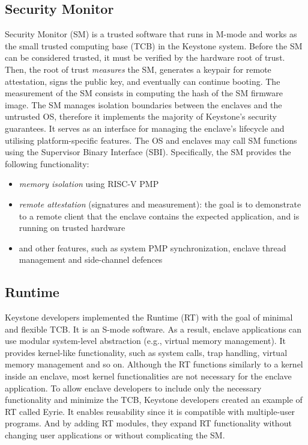 \subsection{Security Monitor}
Security Monitor (SM) is a trusted software that runs in M-mode and works as the small trusted computing base (TCB) in the Keystone system. Before the SM can be considered trusted, it must be verified by the hardware root of trust. Then, the root of trust \textit{measures} the SM, generates a keypair for remote attestation, signs the public key, and eventually can continue booting. The measurement of the SM consists in computing the hash of the SM firmware image. The SM manages isolation boundaries between the enclaves and the untrusted OS, therefore it implements the majority of Keystone's security guarantees.  It serves as an interface for managing the enclave's lifecycle and utilising platform-specific features. The OS and enclaves may call SM functions using the Supervisor Binary Interface (SBI). Specifically, the SM provides the following functionality:
\begin{itemize}
    \item \textit{memory isolation} using RISC-V PMP
    \item \textit{remote attestation} (signatures and measurement): the goal is to demonstrate to a remote client that the enclave contains the expected application, and is running on trusted hardware
    \item and other features, such as system PMP synchronization, enclave thread management and side-channel defences  
\end{itemize}

\subsection{Runtime}
Keystone developers implemented the Runtime (RT) with the goal of minimal and flexible TCB. It is an S-mode software. As a result, enclave applications can use modular system-level abstraction (e.g., virtual memory management). It provides kernel-like functionality, such as system calls, trap handling, virtual memory management and so on. Although the RT functions similarly to a kernel inside an enclave, most kernel functionalities are not necessary for the enclave application. To allow enclave developers to include only the necessary functionality and minimize the TCB, Keystone developers created an example of RT called Eyrie. It enables reusability since it is compatible with multiple-user programs. And by adding RT modules, they expand RT functionality without changing user applications or without complicating the SM.

